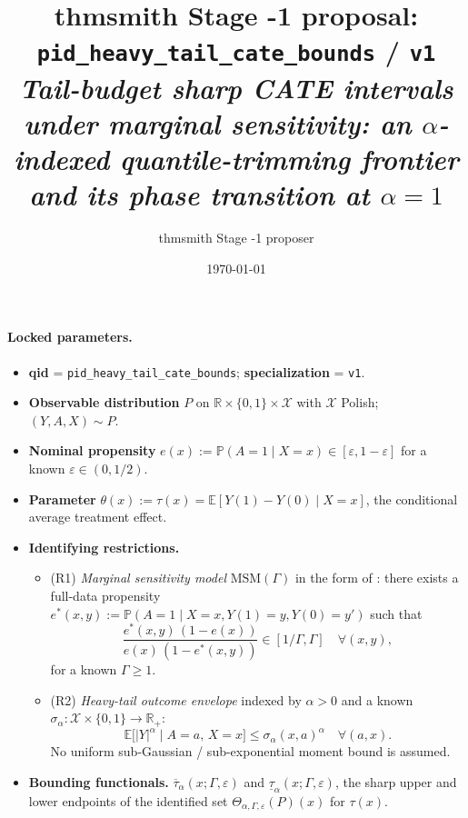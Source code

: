 \documentclass[11pt]{article}
\title{thmsmith Stage -1 proposal: \texttt{pid\_heavy\_tail\_cate\_bounds} / \texttt{v1}%
  \\ \large\textit{Tail-budget sharp CATE intervals under marginal sensitivity: an $\alpha$-indexed quantile-trimming frontier and its phase transition at $\alpha=1$}}
\author{thmsmith Stage -1 proposer}
\date{\today}
\newcommand{\E}{\mathbb{E}}
\renewcommand{\Pr}{\mathbb{P}}
\newcommand{\R}{\mathbb{R}}
\theoremstyle{definition}
\theoremstyle{plain}
\theoremstyle{remark}
\begin{document}
\maketitle


\paragraph{Locked parameters.}
\begin{itemize}[leftmargin=2em]
  \item \textbf{qid} = \texttt{pid\_heavy\_tail\_cate\_bounds}; \textbf{specialization} = \texttt{v1}.
  \item \textbf{Observable distribution} $P$ on $\R \times \{0,1\} \times \mathcal{X}$ with $\mathcal{X}$ Polish; $(Y,A,X) \sim P$.
  \item \textbf{Nominal propensity} $e(x) := \Pr(A = 1 \mid X = x) \in [\varepsilon, 1-\varepsilon]$ for a known $\varepsilon \in (0, 1/2)$.
  \item \textbf{Parameter} $\theta(x) := \tau(x) = \E[Y(1) - Y(0) \mid X = x]$, the conditional average treatment effect.
  \item \textbf{Identifying restrictions.}
    \begin{itemize}[leftmargin=1.5em]
      \item (R1) \emph{Marginal sensitivity model} $\mathrm{MSM}(\Gamma)$ in the form of \citet*{Tan2006}: there exists a full-data propensity $e^*(x,y) := \Pr(A = 1 \mid X=x, Y(1) = y, Y(0) = y')$ such that
        $$\frac{e^*(x,y)\,(1 - e(x))}{e(x)\,(1 - e^*(x,y))} \in [1/\Gamma,\Gamma] \quad \forall (x,y),$$
        for a known $\Gamma \ge 1$.
      \item (R2) \emph{Heavy-tail outcome envelope} indexed by $\alpha > 0$ and a known $\sigma_\alpha: \mathcal{X} \times \{0,1\} \to \R_+$:
        $$\E\bigl[|Y|^\alpha \mid A = a,\, X = x\bigr] \le \sigma_\alpha(x,a)^\alpha \quad \forall (a,x).$$
        No uniform sub-Gaussian / sub-exponential moment bound is assumed.
    \end{itemize}
  \item \textbf{Bounding functionals.} $\overline{\tau}_\alpha(x;\Gamma,\varepsilon)$ and $\underline{\tau}_\alpha(x;\Gamma,\varepsilon)$, the sharp upper and lower endpoints of the identified set $\Theta_{\alpha,\Gamma,\varepsilon}(P)(x)$ for $\tau(x)$.
\end{itemize}
\end{document}
